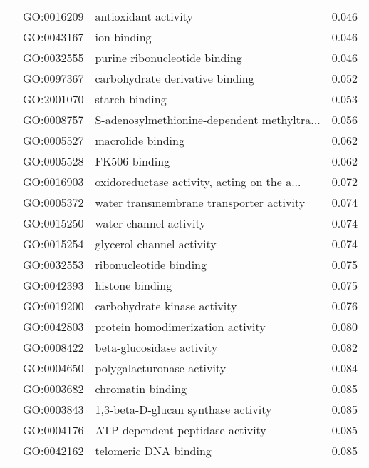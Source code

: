 \begin{longtable}{lllr}
   & GO:0016209 &                         antioxidant activity &         0.046 \\
   & GO:0043167 &                                  ion binding &         0.046 \\
   & GO:0032555 &                purine ribonucleotide binding &         0.046 \\
   & GO:0097367 &              carbohydrate derivative binding &         0.052 \\
   & GO:2001070 &                               starch binding &         0.053 \\
   & GO:0008757 &  S-adenosylmethionine-dependent methyltra... &         0.056 \\
   & GO:0005527 &                            macrolide binding &         0.062 \\
   & GO:0005528 &                                FK506 binding &         0.062 \\
   & GO:0016903 &  oxidoreductase activity, acting on the a... &         0.072 \\
   & GO:0005372 &     water transmembrane transporter activity &         0.074 \\
   & GO:0015250 &                       water channel activity &         0.074 \\
   & GO:0015254 &                    glycerol channel activity &         0.074 \\
   & GO:0032553 &                       ribonucleotide binding &         0.075 \\
   & GO:0042393 &                              histone binding &         0.075 \\
   & GO:0019200 &                 carbohydrate kinase activity &         0.076 \\
   & GO:0042803 &            protein homodimerization activity &         0.080 \\
   & GO:0008422 &                    beta-glucosidase activity &         0.082 \\
   & GO:0004650 &                   polygalacturonase activity &         0.084 \\
   & GO:0003682 &                            chromatin binding &         0.085 \\
   & GO:0003843 &          1,3-beta-D-glucan synthase activity &         0.085 \\
   & GO:0004176 &             ATP-dependent peptidase activity &         0.085 \\
   & GO:0042162 &                        telomeric DNA binding &         0.085 \\

\end{longtable}
